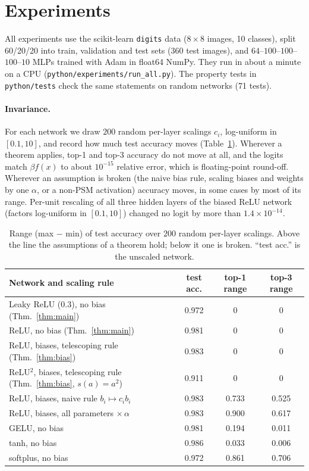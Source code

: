 \documentclass[11pt]{article}
\theoremstyle{definition}
\theoremstyle{remark}
\begin{document}
\section{Experiments}\label{sec:exp}

All experiments use the scikit-learn \texttt{digits} data ($8\times8$ images, 10 classes), split
60/20/20 into train, validation and test sets ($360$ test images), and $64$--$100$--$100$--$100$--$10$
MLPs trained with Adam in float64 NumPy. They run in about a minute on a CPU
(\texttt{python/experiments/run\_all.py}). The property tests in \texttt{python/tests} check the
same statements on random networks (71 tests).

\paragraph{Invariance.} For each network we draw $200$ random per-layer scalings $c_i$,
log-uniform in $[0.1,10]$, and record how much test accuracy moves
(Table~\ref{tab:invariance}). Wherever a theorem applies, top-1 and top-3 accuracy do not move at
all, and the logits match $\beta f(x)$ to about $10^{-15}$ relative error, which is
floating-point round-off. Wherever an assumption is broken (the naive bias rule, scaling biases
and weights by one $\alpha$, or a non-PSM activation) accuracy moves, in some cases by most of its
range. Per-unit rescaling of all three hidden layers of the biased ReLU network (factors
log-uniform in $[0.1,10]$) changed no logit by more than $1.4\times10^{-14}$.

\begin{table}[t]
\centering
\begin{tabular}{lccc}
\toprule
Network and scaling rule & test acc. & top-1 range & top-3 range \\
\midrule
Leaky ReLU (0.3), no bias (Thm.~\ref{thm:main}) & 0.972 & 0 & 0 \\
ReLU, no bias (Thm.~\ref{thm:main}) & 0.981 & 0 & 0 \\
ReLU, biases, telescoping rule (Thm.~\ref{thm:bias}) & 0.983 & 0 & 0 \\
ReLU$^2$, biases, telescoping rule (Thm.~\ref{thm:bias}, $s(a)=a^2$) & 0.911 & 0 & 0 \\
\midrule
ReLU, biases, naive rule $b_i\mapsto c_ib_i$ & 0.983 & 0.733 & 0.525 \\
ReLU, biases, all parameters $\times\,\alpha$ & 0.983 & 0.900 & 0.617 \\
GELU, no bias & 0.981 & 0.194 & 0.011 \\
tanh, no bias & 0.986 & 0.033 & 0.006 \\
softplus, no bias & 0.972 & 0.861 & 0.706 \\
\bottomrule
\end{tabular}
\caption{Range (max $-$ min) of test accuracy over $200$ random per-layer scalings. Above the line
the assumptions of a theorem hold; below it one is broken. ``test acc.'' is the unscaled network.}
\label{tab:invariance}
\end{table}
\end{document}

